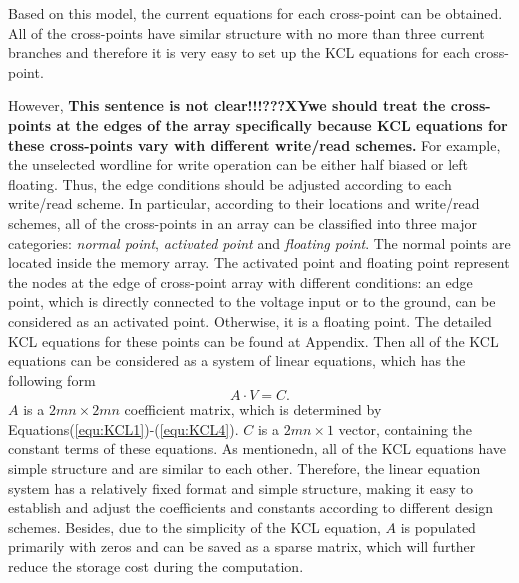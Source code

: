 Based on this model, the current equations for each cross-point can be
obtained. All of the cross-points have similar structure with no more than
three current branches and therefore it is very easy to set up the KCL
equations for each cross-point.

However, 
\textbf{This sentence is not clear!!!???XY}\textbf{we should treat the cross-points at the edges of the array
specifically because KCL equations for these cross-points vary with
different write/read schemes.} For example, the unselected wordline for
write operation can be either half biased or left floating. Thus, the edge
conditions should be adjusted according to each write/read scheme. In
particular, according to their locations and write/read schemes, all of
the cross-points in an array can be classified into three major
categories: \emph{normal point}, \emph{activated point} and \emph{floating
point}. The normal points are located inside the memory array. The
activated point and floating point represent the nodes at the edge of
cross-point array with different conditions: an edge point, which is
directly connected to the voltage input or to the ground, can be
considered as an activated point. Otherwise, it is a floating point. The
detailed KCL equations for these points can be found at Appendix. Then all
of the KCL equations can be considered as a system of linear equations,
which has the following form
\begin{equation}\label{equ:matrix}
A\cdot V = C.
\end{equation}
$A$ is a ${2mn\times{2mn}}$ coefficient matrix, which is determined by
Equations(\ref{equ:KCL1})-(\ref{equ:KCL4}). $C$ is a ${2mn\times{1}}$
vector, containing the constant terms of these equations. As mentionedn,
all of the KCL equations have simple structure and are similar to each
other. Therefore, the linear equation system has a relatively fixed format
and simple structure, making it easy to establish and adjust the
coefficients and constants according to different design schemes. Besides,
due to the simplicity of the KCL equation, $A$ is populated primarily with
zeros and can be saved as a sparse matrix, which will further reduce the
storage cost during the computation.

